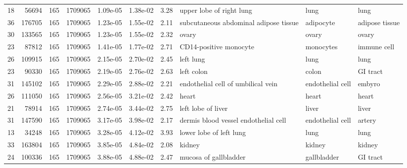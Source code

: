 \begin{landscape}
\begin{table}[h!]
\begin{tabular}{r|r|r|r|r|r|r|l|l|l}
    18 & 56694  & 165 & 1709065 & 1.09e-05 & 1.38e-02 & 3.28              & upper lobe of right lung                               & lung                 & lung                 \\
    36 & 176705 & 165 & 1709065 & 1.23e-05 & 1.55e-02 & 2.11              & subcutaneous abdominal adipose tissue                  & adipocyte            & adipose tissue       \\
    30 & 133565 & 165 & 1709065 & 1.23e-05 & 1.55e-02 & 2.32              & ovary                                                  & ovary                & ovary                \\
    23 & 87812  & 165 & 1709065 & 1.41e-05 & 1.77e-02 & 2.71              & CD14-positive monocyte                                 & monocytes            & immune cell          \\
    26 & 109915 & 165 & 1709065 & 2.15e-05 & 2.70e-02 & 2.45              & left lung                                              & lung                 & lung                 \\
    23 & 90330  & 165 & 1709065 & 2.19e-05 & 2.76e-02 & 2.63              & left colon                                             & colon                & GI tract             \\
    31 & 145102 & 165 & 1709065 & 2.29e-05 & 2.88e-02 & 2.21              & endothelial cell of umbilical vein                     & endothelial cell     & embyro               \\
    26 & 111050 & 165 & 1709065 & 2.56e-05 & 3.21e-02 & 2.42              & heart                                                  & heart                & heart                \\
    21 & 78914  & 165 & 1709065 & 2.74e-05 & 3.44e-02 & 2.75              & left lobe of liver                                     & liver                & liver                \\
    31 & 147590 & 165 & 1709065 & 3.17e-05 & 3.98e-02 & 2.17              & dermis blood vessel endothelial cell                   & endothelial cell     & artery               \\
    13 & 34248  & 165 & 1709065 & 3.28e-05 & 4.12e-02 & 3.93              & lower lobe of left lung                                & lung                 & lung                 \\
    33 & 163804 & 165 & 1709065 & 3.85e-05 & 4.84e-02 & 2.08              & kidney                                                 & kidney               & kidney               \\
    24 & 100336 & 165 & 1709065 & 3.88e-05 & 4.88e-02 & 2.47              & mucosa of gallbladder                                  & gallbladder          & GI tract
    \end{tabular}
\end{table}
\end{landscape}
